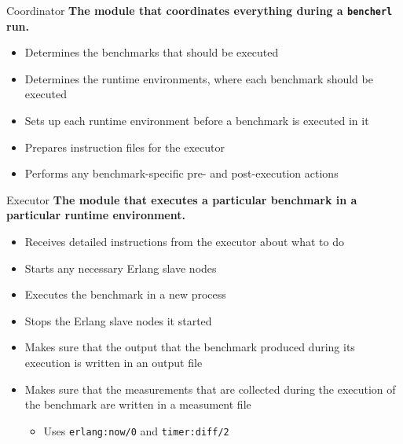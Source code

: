 \documentclass{beamer}
\begin{document}
\begin{frame}[t]{Coordinator}
	{\bf The module that coordinates everything during a \texttt{bencherl} run.}
	\begin{itemize}
		\item Determines the \textcolor{burgundy}{benchmarks} that should be executed
		\item Determines the \textcolor{burgundy}{runtime environments}, where each benchmark should be executed
		\item \textcolor{burgundy}{Sets up} each runtime environment before a benchmark is executed in it
		\item Prepares instruction files for the \textcolor{burgundy}{executor}
		\item Performs any \textcolor{burgundy}{benchmark-specific pre- and post-execution actions}
	\end{itemize}
\end{frame}

\begin{frame}[t]{Executor}
	{\bf The module that executes a particular benchmark in a particular runtime environment.}
	\begin{itemize}
		\item Receives detailed instructions from the \textcolor{burgundy}{executor} about what to do 
		\item \textcolor{burgundy}{Starts} any necessary Erlang slave nodes
		\item \textcolor{burgundy}{Executes} the benchmark in a new process
		\item \textcolor{burgundy}{Stops} the Erlang slave nodes it started
		\item Makes sure that the \textcolor{burgundy}{output} that the benchmark produced during its execution is written in an output file
		\item Makes sure that the \textcolor{burgundy}{measurements} that are collected during the execution of the benchmark are written in a measument file 
			\begin{itemize}
				\item Uses \texttt{erlang:now/0} and \texttt{timer:diff/2}
			\end{itemize}
	\end{itemize}
\end{frame}
\end{document}

